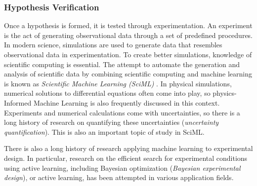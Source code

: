 
\subsubsection{Hypothesis Verification }

Once a hypothesis is formed, it is tested through experimentation. An experiment is the act of generating observational data through a set of predefined procedures. In modern science, simulations are used to generate data that resembles observational data in experimentation. To create better simulations, knowledge of scientific computing is essential. The attempt to automate the generation and analysis of scientific data by combining scientific computing and machine learning is known as \textit{Scientific Machine Learning (SciML)} \cite{baker2019basic}. In physical simulations, numerical solutions to differential equations often come into play, so physics-Informed Machine Learning is also frequently discussed in this context. Experiments and numerical calculations come with uncertainties, so there is a long history of research on quantifying these uncertainties (\textit{uncertainty quantification}). This is also an important topic of study in SciML.

There is also a long history of research applying machine learning to experimental design. In particular, research on the efficient search for experimental conditions using active learning, including Bayesian optimization (\textit{Bayesian experimental design}), or active learning, has been attempted in various application fields.


